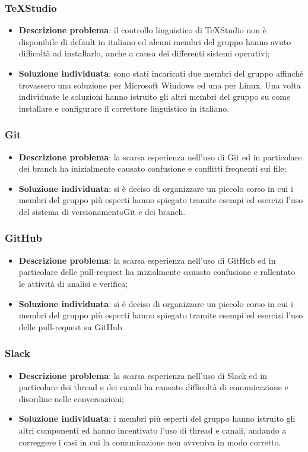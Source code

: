 	\subsubsection{TeXStudio}
		\begin{itemize}
			\item \textbf{Descrizione problema}: il controllo linguistico di TeXStudio non è disponibile di default in italiano ed alcuni membri del gruppo hanno avuto difficoltà ad installarlo, anche a causa dei differenti sistemi operativi;
			\item \textbf{Soluzione individuata}: sono stati incaricati due membri del gruppo affinché trovassero una soluzione per Microsoft Windows ed una per Linux. Una volta individuate le soluzioni hanno istruito gli altri membri del gruppo su come installare e configurare il correttore linguistico in italiano.
		\end{itemize}
	\subsubsection{Git}
		\begin{itemize}
			\item \textbf{Descrizione problema}: la scarsa esperienza nell'uso di Git ed in particolare dei branch ha inizialmente causato confusione e conflitti frequenti sui file;
			\item \textbf{Soluzione individuata}: si è deciso di organizzare un piccolo corso in cui i membri del gruppo più esperti hanno spiegato tramite esempi ed esercizi l'uso del sistema di versionamento\glosp Git e dei branch. 
		\end{itemize}
	\subsubsection{GitHub}
		\begin{itemize}
		\item \textbf{Descrizione problema}: la scarsa esperienza nell'uso di GitHub ed in particolare delle pull-request ha inizialmente causato confusione e rallentato le attività di analisi e verifica;
		\item \textbf{Soluzione individuata}: si è deciso di organizzare un piccolo corso in cui i membri del gruppo più esperti hanno spiegato tramite esempi ed esercizi l'uso delle pull-request su GitHub. 
		\end{itemize}
	\subsubsection{Slack}
		\begin{itemize}
			\item \textbf{Descrizione problema}: la scarsa esperienza nell'uso di Slack ed in particolare dei thread e dei canali ha causato difficoltà di comunicazione e disordine nelle conversazioni;
			\item \textbf{Soluzione individuata}: i membri più esperti del gruppo hanno istruito gli altri componenti ed hanno incentivato l'uso di thread e canali, andando a correggere i casi in cui la comunicazione non avveniva in modo corretto. 
		\end{itemize}